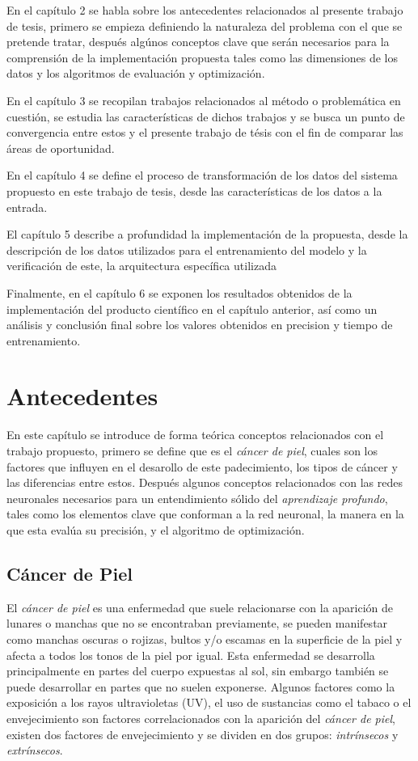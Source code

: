 En el capítulo 2 se habla sobre los antecedentes relacionados al presente trabajo de tesis, primero se empieza definiendo la naturaleza del problema con el que se pretende tratar, después algúnos conceptos clave que serán necesarios para la comprensión de la implementación propuesta tales como las dimensiones de los datos y los algoritmos de evaluación y optimización.

En el capítulo 3 se recopilan trabajos relacionados al método o problemática en cuestión, se estudia las características de dichos trabajos y se busca un punto de convergencia entre estos y el presente trabajo de tésis con el fin de comparar las áreas de oportunidad.

En el capítulo 4 se define el proceso de transformación de los datos del sistema propuesto en este trabajo de tesis, desde las características de los datos a la entrada.

El capítulo 5 describe a profundidad la implementación de la propuesta, desde la descripción de los datos utilizados para el entrenamiento del modelo y la verificación de este, la arquitectura específica utilizada 


Finalmente, en el capítulo 6 se exponen los resultados obtenidos de la implementación del producto científico en el capítulo anterior, así como un análisis y conclusión final sobre los valores obtenidos en precision y tiempo de entrenamiento. 

\chapter{Antecedentes}
En este capítulo se introduce de forma teórica conceptos relacionados con el trabajo propuesto, primero se define que es el \emph{cáncer de piel}, cuales son los factores que influyen en el desarollo de este padecimiento, los tipos de cáncer y las diferencias entre estos. Después algunos conceptos relacionados con las redes neuronales necesarios para un entendimiento sólido del \emph{aprendizaje profundo}, tales como los elementos clave que conforman a la red neuronal, la manera en la que esta evalúa su precisión, y el algoritmo de optimización.

\section{Cáncer de Piel}
El \emph{cáncer de piel} es una enfermedad que suele relacionarse con la aparición de lunares o manchas que no se encontraban previamente, se pueden manifestar como manchas oscuras o rojizas, bultos y/o escamas en la superficie de la piel y afecta a todos los tonos de la piel por igual. Esta enfermedad se desarrolla principalmente en partes del cuerpo expuestas al sol, sin embargo también se puede desarrollar en partes que no suelen exponerse. Algunos factores como la exposición a los rayos ultravioletas (UV), el uso de sustancias como el tabaco o el envejecimiento son factores correlacionados con la aparición del \emph{cáncer de piel}, existen dos factores de envejecimiento y se dividen en dos grupos: \emph{intrínsecos} y \emph{extrínsecos}.


